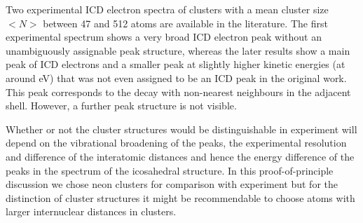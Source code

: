 Two experimental ICD electron spectra of clusters
with a mean cluster size $<N>$ between 47 and 512 atoms
are available in the literature.
\cite{Marburger03,Barth06_2} 
The first experimental spectrum shows a very
broad ICD electron peak without an unambiguously assignable peak structure,
whereas the later results show a main peak of ICD electrons and a smaller peak
at slightly higher kinetic energies (at around \unit[3]{eV})
that was not even assigned to be an ICD peak in the original work. This peak
corresponds to the decay with non-nearest neighbours in the adjacent shell.
However, a further peak
structure is not visible.

Whether or not the cluster structures would be distinguishable in experiment
will depend on the vibrational broadening of the peaks, the experimental
resolution and difference of the interatomic distances
and hence the energy difference of the peaks in the spectrum of the
icosahedral structure. In this proof-of-principle discussion
we chose neon clusters for comparison with experiment but for the distinction
of cluster structures it might be recommendable to choose atoms with larger
internuclear distances in clusters.

